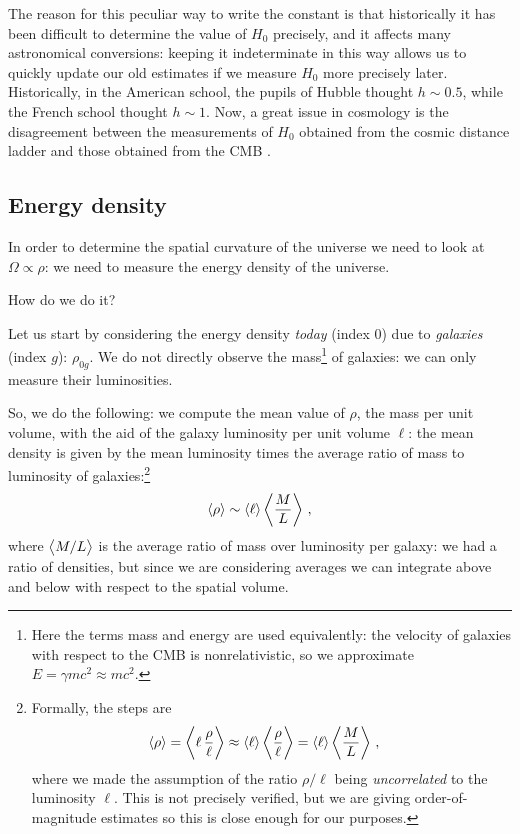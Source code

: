 \documentclass[main.tex]{subfiles}
\begin{document}
The reason for this peculiar way to write the constant is that historically it has been difficult to determine the value of \(H_0 \) precisely, and it affects many astronomical conversions: keeping it indeterminate in this way allows us to quickly update our old estimates if we measure \(H_0 \) more precisely later.
Historically, in the American school, the pupils of Hubble thought \(h \sim 0.5\), while the French school thought \(h \sim 1\).
Now, a great issue in cosmology is the disagreement between the measurements of \(H_0 \) obtained from the cosmic distance ladder and those obtained from the CMB \cite[]{wongH0LiCOWXIIIMeasurement2019}.

\subsection{Energy density}

In order to determine the spatial curvature of the universe we need to look at \(\Omega \propto \rho \): we need to measure the energy density of the universe.

How do we do it?

Let us start by considering the energy density \emph{today} (index 0) due to \emph{galaxies} (index \(g\)): \(\rho_{0g}\).
We do not directly observe the mass\footnote{Here the terms mass and energy are used equivalently: the velocity of galaxies with respect to the CMB is nonrelativistic, so we approximate \(E = \gamma m c^2 \approx m c^2\).}  
of galaxies: we can only measure their luminosities.

So, we do the following: we compute the mean value of \(\rho \), the mass per unit volume, with the aid of the galaxy luminosity per unit volume \(\ell\): the mean density is given by the mean luminosity times the average ratio of mass to luminosity of galaxies:\footnote{Formally, the steps are %
\begin{align}
\expval{\rho }
&= \expval{\ell \,\frac{\rho }{\ell}} 
\approx \expval{\ell} \expval{\frac{\rho }{\ell}} 
= \expval{\ell} \expval{\frac{M}{L}}
\,,
\end{align}
%
where we made the assumption of the ratio \(\rho / \ell\) being \emph{uncorrelated} to the luminosity \(\ell\). 
This is not precisely verified, but we are giving order-of-magnitude estimates so this is close enough for our purposes.}
%
\begin{align}
\expval{\rho }
\sim \expval{\ell} \expval{\frac{M}{L}}
\,,
\end{align}
%
where \(\expval{M  / L}\) is the average ratio of mass over luminosity per galaxy: we had a ratio of densities, but since we are considering averages we can integrate above and below with respect to the spatial volume.
\end{document}
